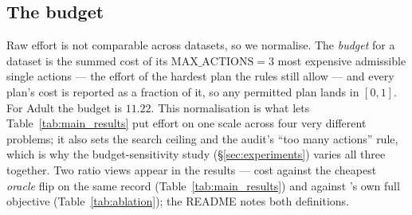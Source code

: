 \subsection{The budget}
\label{sec:budget}
Raw effort is not comparable across datasets, so we normalise. The
\emph{budget} for a dataset is the summed cost of its
$\text{MAX\_ACTIONS}=3$ most expensive admissible single actions --- the effort of
the hardest plan the rules still allow --- and every plan's cost is reported as a
fraction of it, so any permitted plan lands in $[0,1]$. For Adult the budget is
$11.22$. This normalisation is what lets Table~\ref{tab:main_results} put effort
on one scale across four very different problems; it also sets the search ceiling
and the audit's ``too many actions'' rule, which is why the budget-sensitivity
study (\S\ref{sec:experiments}) varies all three together. Two ratio views appear
in the results --- cost against the cheapest \emph{oracle} flip on the same record
(Table~\ref{tab:main_results}) and against \cac{}'s own full objective
(Table~\ref{tab:ablation}); the README notes both definitions.
